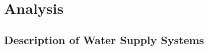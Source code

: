 
\part{Analysis}
\label{system_analysis}

\chapter{Description of Water Supply Systems}
\label{description_of_water_supply_systems}

 

 
























